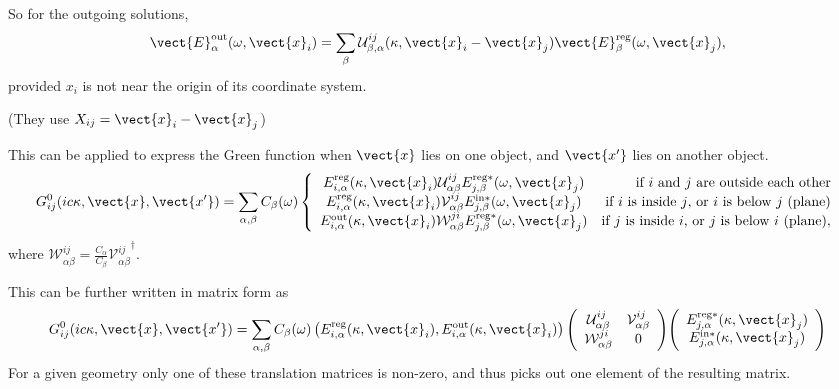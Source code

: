 So for the outgoing solutions, 
\begin{equation}
\vect{E}^\text{out}_\alpha(\omega,\vect{x}_i) = \sum_{\beta}\mathcal{U}^{ij}_{\beta,\alpha}(\kappa,\vect{x}_i-\vect{x}_j)
\vect{E}^\text{reg}_\beta(\omega,\vect{x}_j),
\end{equation}
provided $x_i$ is not near the origin of its coordinate system.  

(They use $X_{ij}=\vect{x}_i-\vect{x}_j$)

This can be applied to express the Green function when $\vect{x}$ lies on one object,
and $\vect{x'}$ lies on another object.  
\begin{equation}
G^0_{ij}(ic\kappa,\vect{x},\vect{x'})=\sum_{\alpha,\beta} C_\beta(\omega)\left\{\begin{array}{cr}
E_{i,\alpha}^\mathrm{reg}(\kappa,\vect{x}_i) \mathcal{U}^{ij}_{\alpha\beta} E_{j,\beta}^{\mathrm{reg}*}(\omega,\vect{x}_j)
& \text{if $i$ and $j$ are outside each other}\\
E_{i,\alpha}^\mathrm{reg}(\kappa,\vect{x}_i) \mathcal{V}^{ij}_{\alpha\beta} E_{j,\beta}^{\mathrm{in}*}(\omega,\vect{x}_j)
& \text{if $i$ is inside $j$, or $i$ is below $j$ (plane)}\\
E_{i,\alpha}^\mathrm{out}(\kappa,\vect{x}_i) \mathcal{W}^{ji}_{\alpha\beta} E_{j,\beta}^{\mathrm{reg}*}(\omega,\vect{x}_j)
& \text{if $j$ is inside $i$, or $j$ is below $i$ (plane)},
\end{array}\right.\label{eq:G0_expansion}
\end{equation}
where $\mathcal{W}^{ij}_{\alpha\beta}=\frac{C_\alpha}{C_\beta}{\mathcal{V}^{ij}_{\alpha\beta}}^\dag$.

This can be further written in matrix form as 
\begin{equation}
G^0_{ij}(ic\kappa,\vect{x},\vect{x'})=\sum_{\alpha,\beta}C_\beta(\omega)
\left( E_{i,\alpha}^\mathrm{reg}(\kappa,\vect{x}_i), E_{i,\alpha}^\mathrm{out}(\kappa,\vect{x}_i)\right)
\Bigg(
\begin{array}{cc}
\mathcal{U}^{ij}_{\alpha\beta} & \mathcal{V}^{ij}_{\alpha\beta}\\
\mathcal{W}^{ji}_{\alpha\beta} & 0
\end{array}\Bigg)
\Bigg(\begin{array}{c}
 E_{j,\alpha}^{\mathrm{reg}*}(\kappa,\vect{x}_j)\\
E_{j,\alpha}^{\mathrm{in}*}(\kappa,\vect{x}_j)
\end{array}
\Bigg)
\end{equation}
For a given geometry only one of these translation matrices is non-zero, and thus picks out 
one element of the resulting matrix.  

